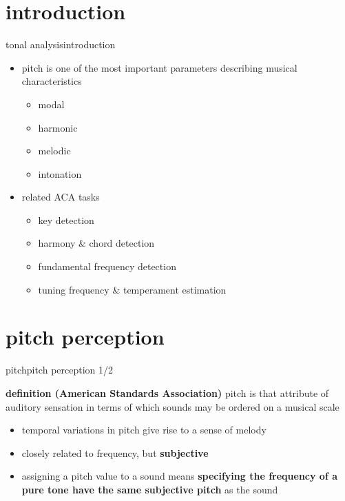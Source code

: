    \section[intro]{introduction}
        \begin{frame}{tonal analysis}{introduction}
            \begin{itemize}
                \item pitch is one of the most important parameters describing musical characteristics
                    \begin{itemize}
                        \item   modal
                        \item   harmonic
                        \item   melodic
                        \item   intonation
                    \end{itemize}
                \item<2-> related ACA tasks
                    \begin{itemize}
                        \item   key detection
                        \item   harmony \& chord detection
                        \item   fundamental frequency detection
                        \item   tuning frequency \& temperament estimation
                    \end{itemize}
            \end{itemize}
        \end{frame}

    \section[perception]{pitch perception}
         \begin{frame}{pitch}{pitch perception 1/2}
            \begin{block}{\textbf{definition (American Standards Association)}}
                pitch is that attribute of auditory sensation in terms of which sounds may be ordered on a musical scale
            \end{block}
            \bigskip    
            \begin{itemize}
                \item<2->   temporal variations in pitch give rise to a sense of melody
                \item<2->   closely related to frequency, but \textbf{subjective}

                \bigskip
                \item<3->[$\Rightarrow$]   assigning a pitch value to a sound means \textbf{specifying the frequency of a pure tone have the same subjective pitch} as the sound
            \end{itemize}
        \end{frame}
        
